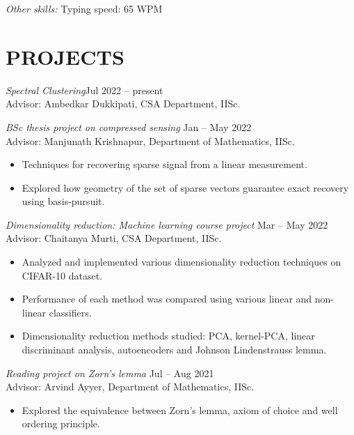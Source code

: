 \documentclass[margin, 10pt]{res} %
\newenvironment{changemargin}[2]{%
\begin{list}{}{%
\setlength{\topsep}{0pt}%
\setlength{\leftmargin}{#1}%
\setlength{\rightmargin}{#2}%
\setlength{\listparindent}{\parindent}%
\setlength{\itemindent}{\parindent}%
\setlength{\parsep}{\parskip}%
}%
\item[]}{\end{list}}
\begin{document}
\begin{resume}
{\sl Other skills:} Typing speed: 65 WPM
 
 
\section{PROJECTS}
{\sl Spectral Clustering}\hfill Jul 2022 -- present\\
Advisor: Ambedkar Dukkipati, CSA Department, IISc.

{\sl BSc thesis project on compressed sensing} \hfill  Jan -- May 2022\\
Advisor: Manjunath Krishnapur, Department of Mathematics, IISc.
\begin{changemargin}{0pt}{80pt}
\begin{itemize} \itemsep -2pt
	\item Techniques for recovering sparse signal from a linear measurement.
	\item Explored how geometry of the set of sparse vectors
		guarantee exact recovery using basis-pursuit.
\end{itemize} 
\end{changemargin}

\bigskip

{\sl Dimensionality reduction: Machine learning course project} \hfill Mar -- May 2022\\
	Advisor: Chaitanya Murti, CSA Department, IISc.
\begin{changemargin}{0pt}{80pt}
	\begin{itemize}
		\item Analyzed and implemented various dimensionality
			reduction techniques on CIFAR-10 dataset.
		\item Performance of each method was compared using various
			linear and non-linear classifiers.
		\item Dimensionality reduction methods studied: PCA,
			kernel-PCA, linear discriminant analysis, autoencoders
			and Johnson Lindenstrauss lemma.
	\end{itemize}
\end{changemargin}

\bigskip

{\sl Reading project on Zorn's lemma} \hfill Jul -- Aug 2021 \\
Advisor: Arvind Ayyer, Department of Mathematics, IISc.
\begin{changemargin}{0pt}{80pt}
\begin{itemize} 
	\item Explored the equivalence between Zorn's lemma,
		axiom of choice and well ordering principle.
\end{itemize} 
\end{changemargin}


\end{resume}
\end{document}

